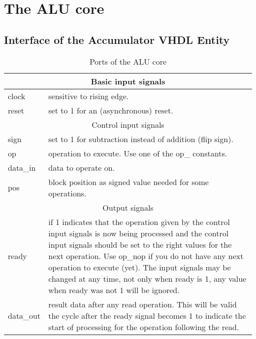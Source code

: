 \chapter{The ALU core}
\section{Interface of the Accumulator VHDL Entity}
\newcommand\tabhead[1]{\hline\multicolumn{2}{|c|}{#1}\\ \hline}
\newcommand\tabline[2]{#1 & #2\\ \hline}
\begin{table}[htbp]
\begin{tabular}{|l|p{}|}
\tabhead     {Basic input signals}
\tabline {clock}     {sensitive to rising edge.}
\tabline {reset}     {set to 1 for an (asynchronous) reset.}
\hline
\tabhead     {Control input signals}
\tabline {sign}      {set to 1 for subtraction instead of addition (flip sign).}
\tabline {op}        {operation to execute. Use one of the op\_ constants.}
\tabline {data\_in}  {data to operate on.}
\tabline {pos}       {block position as signed value needed for some operations.}
\hline
\tabhead     {Output signals}
\tabline {ready}     {
        if 1 indicates that the operation given by the control input signals
        is now being processed and the control input signals should be set to
        the right values for the next operation.
        Use op\_nop if you do not have any next operation to execute (yet).
        The input signals may be changed at any time, not only when ready
        is 1, any value when ready was not 1 will be ignored.}
\tabline {data\_out} {
        result data after any read operation. This will be valid the
        cycle after the ready signal becomes 1 to indicate the start of
        processing for the operation following the read.}
\end{tabular}
\caption{Ports of the ALU core}
\end{table}

